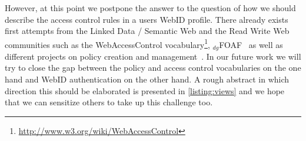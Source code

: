 \documentclass[a4paper]{llncs}
\begin{document}
However, at this point we postpone the answer to the question of how we should describe the access control rules in a users WebID profile.
There already exists first attempts from the Linked Data / Semantic Web and the Read Write Web communities such as the WebAccessControl vocabulary\footnote{\url{http://www.w3.org/wiki/WebAccessControl}}, $_{dg}$FOAF~\cite{schwagereit-f-2010-181-a} as well as different projects on policy creation and management~\cite{kagal-l-2005--a,kagal-l-2005--b}.
In our future work we will try to close the gap between the policy and access control vocabularies on the one hand and WebID authentication on the other hand.
A rough abstract in which direction this should be elaborated is presented in \autoref{listing:views} and we hope that we can sensitize others to take up this challenge too.



\end{document}
